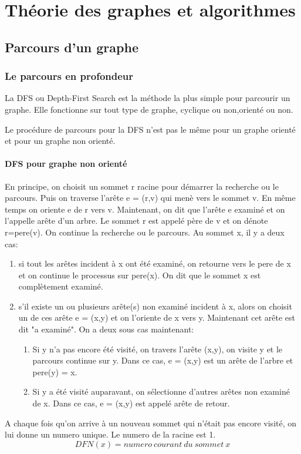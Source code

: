 \chapter{Théorie des graphes et algorithmes}
\section{Parcours d'un graphe}
\subsection{Le parcours en profondeur}
La DFS ou Depth-First Search  est la méthode la plus simple pour parcourir un graphe. Elle fonctionne sur tout type de graphe, cyclique ou non,orienté ou non.

Le procédure de parcours pour la DFS n'est pas le même pour un graphe orienté et pour un graphe non orienté.

\subsubsection{DFS pour graphe non orienté}
En principe, on choisit un sommet r racine pour démarrer la recherche ou le parcours. Puis on traverse l'arête e = (r,v) qui menè vers le sommet v. En même temps on oriente e de r vers v. Maintenant, on dit que l'arête e examiné et on l'appelle arête d'un arbre.
Le sommet r est appelé père de v et on dénote r=pere(v). On continue la recherche ou le parcours.
Au sommet x, il y a deux cas:
\begin{enumerate}
	\item si tout les arêtes incident à x ont été examiné, on retourne vers le pere de x et on continue le processus sur pere(x). On dit que le sommet x est complètement examiné.
	\item s'il existe un ou plusieurs arête(s) non examiné incident à x, alors on choisit un de ces arête e = (x,y) et on l'oriente de x vers y. Maintenant cet arête est dit "a examiné". On a deux sous cas maintenant:
	\begin{enumerate}
		\item Si y n'a pas encore été visité, on travers l'arête (x,y), on visite y et le parcours continue sur y. Dans ce cas, e = (x,y) est un arête de l'arbre et pere(y) = x.
		\item Si y a été visité auparavant, on sélectionne d'autres arêtes non examiné de x. Dans ce cas, e = (x,y) est appelé arête de retour.  
	\end{enumerate} 
\end{enumerate}
A chaque fois qu'on arrive à un nouveau sommet qui n'était pas encore visité, on lui donne un numero unique. Le numero de la racine est 1.
$$DFN(x)=numero\ courant\ du\ sommet\ x$$ 

